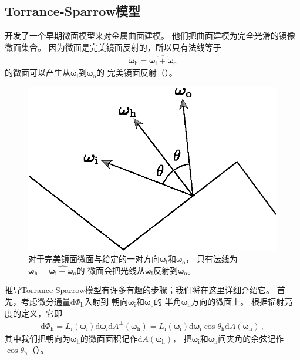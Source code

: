 \subsection{Torrance-Sparrow模型}\label{sub:Torrance-Sparrow模型}
\citet{Torrance:67}开发了一个早期微面模型来对金属曲面建模。
他们把曲面建模为完全光滑的镜像微面集合。
因为微面是完美镜面反射的，所以只有法线等于
\begin{align*}
    {\bm\omega}_{\mathrm{h}}=\widehat{{\bm\omega}_{\mathrm{i}}+{\bm\omega}_{\mathrm{o}}}
\end{align*}
的微面可以产生从${\bm\omega}_{\mathrm{i}}$到${\bm\omega}_{\mathrm{o}}$的
完美镜面反射（）。
\begin{figure}[htbp]
    \centering
    \includegraphics[width=0.5\linewidth]{Pictures/chap08/SpecularMicrofacetReflection.eps}
    \caption{对于完美镜面微面与给定的一对方向${\bm\omega}_{\mathrm{i}}$和${\bm\omega}_{\mathrm{o}}$，
    只有法线为${\bm\omega}_{\mathrm{h}}=\widehat{{\bm\omega}_{\mathrm{i}}+{\bm\omega}_{\mathrm{o}}}$的
    微面会把光线从${\bm\omega}_{\mathrm{i}}$反射到${\bm\omega}_{\mathrm{o}}$。}
    \label{fig:8.19}
\end{figure}

推导Torrance-Sparrow模型有许多有趣的步骤；我们将在这里详细介绍它。
首先，考虑微分通量$\mathrm{d}\varPhi_{\mathrm{h}}$入射到
朝向${\bm\omega}_{\mathrm{i}}$和${\bm\omega}_{\mathrm{o}}$的
半角${\bm\omega}_{\mathrm{h}}$方向的微面上。
根据辐射亮度的定义，它即
\begin{align*}
    \mathrm{d}\varPhi_{\mathrm{h}}=L_{\mathrm{i}}({\bm\omega}_{\mathrm{i}})
    \mathrm{d}{\bm\omega}_{\mathrm{i}}\mathrm{d}A^{\perp}({\bm\omega}_{\mathrm{h}})
    =L_{\mathrm{i}}({\bm\omega}_{\mathrm{i}})\mathrm{d}{\bm\omega}_{\mathrm{i}}
    \cos\theta_{\mathrm{h}}\mathrm{d}A({\bm\omega}_{\mathrm{h}})\, ,
\end{align*}
其中我们把朝向为${\bm\omega}_{\mathrm{h}}$的微面面积记作$\mathrm{d}A({\bm\omega}_{\mathrm{h}})$，
把${\bm\omega}_{\mathrm{i}}$和${\bm\omega}_{\mathrm{h}}$间夹角的余弦记作$\cos\theta_{\mathrm{h}}$（）。

